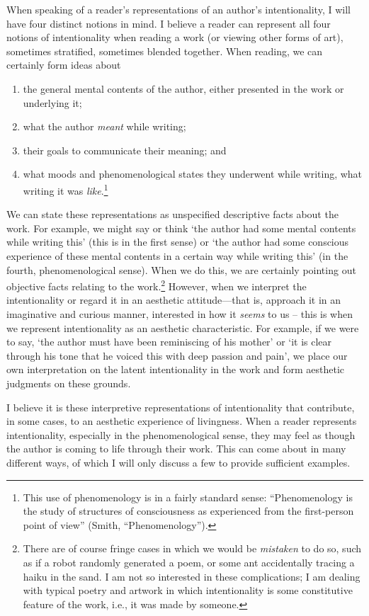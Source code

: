 When speaking of a reader's representations of an author's
intentionality, I will have four distinct notions in mind. I believe a
reader can represent all four notions of intentionality when reading a
work (or viewing other forms of art), sometimes stratified, sometimes
blended together. When reading, we can certainly form ideas about 
	\begin{enumerate}
		\item the
general mental contents of the author, either presented in the work or
underlying it; 
		\item what the author \emph{meant} while writing; 
		\item their goals to communicate their meaning; and 
		\item what moods and
phenomenological states they underwent while writing, what writing it
was \emph{like}.\footnote{This use of phenomenology is in a fairly
  standard sense: ``Phenomenology is the study of structures of
  consciousness as experienced from the first-person point of view''
  (Smith, ``Phenomenology'').}
  \end{enumerate}
We can state these representations as
unspecified descriptive facts about the work. For example, we might say
or think `the author had some mental contents while writing this' (this
is in the first sense) or `the author had some conscious experience of
these mental contents in a certain way while writing this' (in the
fourth, phenomenological sense). When we do this, we are certainly
pointing out objective facts relating to the work.\footnote{There are of
  course fringe cases in which we would be \emph{mistaken} to do so,
  such as if a robot randomly generated a poem, or some ant accidentally
  tracing a haiku in the sand. I am not so interested in these
  complications; I am dealing with typical poetry and artwork in which
  intentionality is some constitutive feature of the work, i.e., it was
  made by someone.} However, when we interpret the intentionality or
regard it in an aesthetic attitude---that is, approach it in an
imaginative and curious manner, interested in how it \emph{seems} to us
-- this is when we represent intentionality as an aesthetic
characteristic. For example, if we were to say, `the author must have
been reminiscing of his mother' or `it is clear through his tone that he
voiced this with deep passion and pain', we place our own interpretation
on the latent intentionality in the work and form aesthetic judgments on
these grounds.

I believe it is these interpretive representations of intentionality
that contribute, in some cases, to an aesthetic experience of
livingness\emph{.} When a reader represents intentionality, especially
in the phenomenological sense, they may feel as though the author is
coming to life through their work. This can come about in many different
ways, of which I will only discuss a few to provide sufficient examples.

